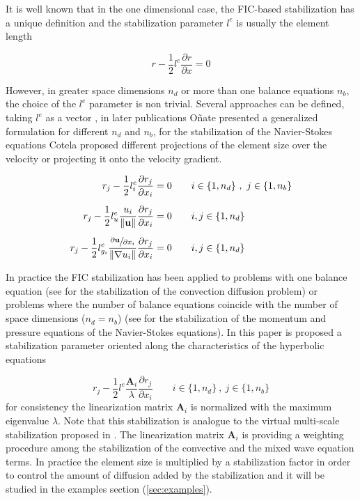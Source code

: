 \documentclass[a4paper,12pt]{article}
\newcommand{\pder}[2]{\frac{\partial#1}{\partial#2}}
\newcommand{\norm}[1]{\lVert#1\rVert}
\begin{document}
It is well known that in the one dimensional case, the FIC-based stabilization has a unique definition and the stabilization parameter $l^e$ is usually the element length

\begin{equation}
r - \frac{1}{2}l^e\pder{r}{x} = 0
\end{equation}

However, in greater space dimensions $n_d$ or more than one balance equations $n_b$, the choice of the $l^e$ parameter is non trivial. Several approaches can be defined, taking $l^e$ as a vector \cite{onate1998}, in later publications Oñate \cite{onate2001} presented a generalized formulation for different $n_d$ and $n_b$, for the stabilization of the Navier-Stokes equations Cotela \cite{cotela2016} proposed different projections of the element size over the velocity or projecting it onto the velocity gradient.

\begin{subequations}
\begin{align}
r_j - \frac{1}{2}l^e_i\pder{r_j}{x_i} &= 0
    \qquad i\in\{1,n_d\} \ ,\ j\in\{1,n_b\}\\[5pt]
r_j - \frac{1}{2}l^e_u\frac{u_i}{\norm{\mathbf{u}}}\pder{r_j}{x_i} &= 0
    \qquad i,j\in\{1,n_d\}\\[5pt]
r_j - \frac{1}{2}l^e_{g_i}\frac{\sfrac{\partial\mathbf{u}}{\partial x_i}}{\norm{\nabla u_i}}\pder{r_j}{x_i} &= 0
    \qquad i,j\in\{1,n_d\}
\end{align}
\end{subequations}

In practice the FIC stabilization has been applied to problems with one balance equation (see \cite{onate1998} for the stabilization of the convection diffusion problem) or problems where the number of balance equations coincide with the number of space dimensions ($n_d = n_b$) (see \cite{onate1998} for the stabilization of the momentum and pressure equations of the Navier-Stokes equations). In this paper is proposed a stabilization parameter oriented along the characteristics of the hyperbolic equations

\begin{equation} \label{fic_sw}
r_j - \frac{1}{2}l^e\frac{\mathbf{A}_i}{\lambda}\pder{r_j}{x_i}
    \qquad i\in\{1,n_d\} \ ,\ j\in\{1,n_b\}
\end{equation}
for consistency the linearization matrix $\mathbf{A}_i$ is normalized with the maximum eigenvalue $\lambda$. Note that this stabilization is analogue to the virtual multi-scale stabilization proposed in \cite{codina2008b}. The linearization matrix $\mathbf{A}_i$ is providing a weighting procedure among the stabilization of the convective and the mixed wave equation terms. In practice the element size is multiplied by a stabilization factor in order to control the amount of diffusion added by the stabilization and it will be studied in the examples section (\ref{sec:examples}).
\end{document}
